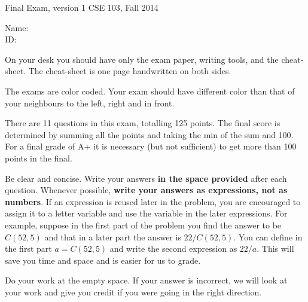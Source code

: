 \documentclass[10pt,dvips]{amsart}
\begin{document}
\voffset=-0.8in
\newpage
{\textbf \Large Final Exam, version 1} \hfill CSE 103, Fall 2014
\\

\vspace{.25in}

Name: \underline{\hspace{3in}}
\\

ID: \underline{\hspace{3.2in}}
\\

\vspace{0.5in}

On your desk you should have only the exam paper, writing tools, and
the cheat-sheet. The cheat-sheet is one page handwritten on both sides.

The exams are color coded. Your exam should have different color 
than that of your neighbours to the left, right and in front.

There are 11 questions in this exam, totalling 125 points.  The final
score is determined by summing all the points and taking the min of
the sum and 100. For a final grade of A+ it is necessary (but not
sufficient) to get more than 100 points in the final. 

Be clear and concise. Write your answers {\bf in the space provided}
after each question. Whenever possible, {\bf write your answers
as expressions, not as numbers}. If an expression is reused
later in the problem, you are encouraged to assign it to a letter
variable and use the variable in the later expressions. For example,
suppose in the first part of the problem you find the answer to be
$C(52,5)$ and that in a later part the answer is $22/C(52,5)$. You can
define in the first part $a=C(52,5)$ and write the second expression
as $22/a$. This will save you time and space and is easier for us to
grade.

Do your work at the empty space. If your answer is incorrect, we will
look at your work and give you credit if you were going in the right direction.

\vspace{0.2in}
\end{document}
